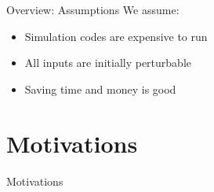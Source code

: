 \documentclass[t,9pt,svgnames]{beamer}
\begin{document}
\begin{frame}{Overview: Assumptions}
  We assume:
  \vfill
  \begin{itemize}
    \item Simulation codes are expensive to run
  \vfill
    \item All inputs are initially perturbable
  \vfill
    \item Saving time and money is good
  \end{itemize}
  \vfill
\end{frame}

\section{Motivations}
\begin{frame}{Motivations}
\end{frame}
\end{document}
